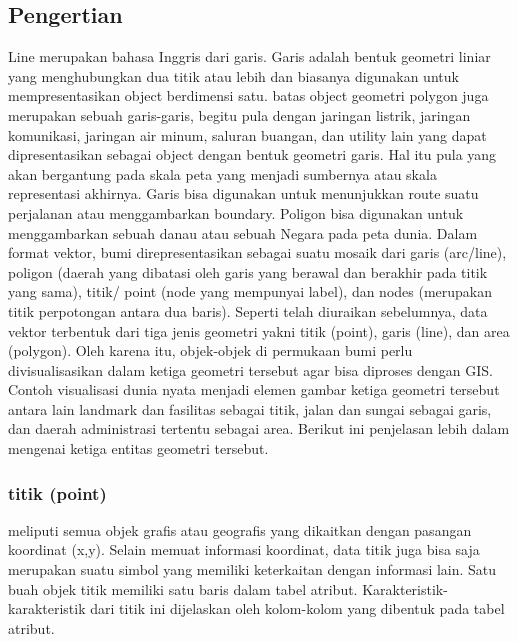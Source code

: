 \subsection{Pengertian}
  Line merupakan bahasa Inggris dari garis. Garis adalah bentuk geometri liniar yang
 menghubungkan dua titik atau lebih dan biasanya digunakan untuk mempresentasikan
 object berdimensi satu. batas object geometri polygon juga merupakan sebuah garis-garis,
 begitu pula dengan jaringan listrik, jaringan komunikasi, jaringan air minum, saluran buangan,
 dan utility lain yang dapat dipresentasikan sebagai object dengan bentuk geometri garis.
 Hal itu pula yang akan bergantung pada skala peta yang menjadi sumbernya atau skala
 representasi akhirnya.
  Garis bisa digunakan untuk menunjukkan route suatu perjalanan atau menggambarkan boundary. 
 Poligon bisa digunakan untuk menggambarkan sebuah danau atau sebuah Negara pada peta dunia. 
 Dalam format vektor, bumi direpresentasikan sebagai suatu mosaik dari garis (arc/line), 
 poligon (daerah yang dibatasi oleh garis yang berawal dan berakhir pada titik yang sama), 
 titik/ point (node yang mempunyai label), dan nodes (merupakan titik perpotongan antara dua baris).
  Seperti telah diuraikan sebelumnya, data vektor terbentuk dari tiga jenis geometri yakni 
 titik (point), garis (line), dan area (polygon). 
 Oleh karena itu, objek-objek di permukaan bumi perlu divisualisasikan 
 dalam ketiga geometri tersebut agar bisa diproses dengan GIS. 
 Contoh visualisasi dunia nyata menjadi elemen gambar ketiga geometri tersebut antara lain landmark dan fasilitas sebagai titik, 
 jalan dan sungai sebagai garis, dan daerah administrasi tertentu sebagai area. 
 Berikut ini penjelasan lebih dalam mengenai ketiga entitas geometri tersebut.
 
 \subsubsection{titik (point)}
  meliputi semua objek grafis atau geografis yang dikaitkan dengan pasangan koordinat (x,y). 
  Selain memuat informasi koordinat, data  titik juga bisa saja merupakan suatu simbol yang memiliki 
  keterkaitan dengan informasi lain.  Satu buah objek titik memiliki satu baris dalam tabel atribut. 
  Karakteristik-karakteristik dari titik ini dijelaskan oleh kolom-kolom yang dibentuk pada tabel atribut.
  
